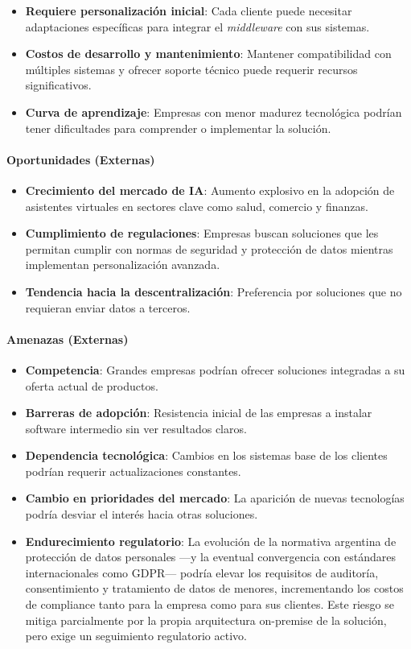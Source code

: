 \begin{itemize}
    \item \textbf{Requiere personalización inicial}: Cada cliente puede necesitar adaptaciones específicas para integrar el \textit{middleware} con sus sistemas.
    \item \textbf{Costos de desarrollo y mantenimiento}: Mantener compatibilidad con múltiples sistemas y ofrecer soporte técnico puede requerir recursos significativos.
    \item \textbf{Curva de aprendizaje}: Empresas con menor madurez tecnológica podrían tener dificultades para comprender o implementar la solución.
\end{itemize}

\paragraph{Oportunidades (Externas)}

\begin{itemize}
    \item \textbf{Crecimiento del mercado de IA}: Aumento explosivo en la adopción de asistentes virtuales en sectores clave como salud, comercio y finanzas.
    \item \textbf{Cumplimiento de regulaciones}: Empresas buscan soluciones que les permitan cumplir con normas de seguridad y protección de datos mientras implementan personalización avanzada.
    \item \textbf{Tendencia hacia la descentralización}: Preferencia por soluciones que no requieran enviar datos a terceros.
\end{itemize}

\paragraph{Amenazas (Externas)}

\begin{itemize}
    \item \textbf{Competencia}: Grandes empresas podrían ofrecer soluciones integradas a su oferta actual de productos.
    \item \textbf{Barreras de adopción}: Resistencia inicial de las empresas a instalar software intermedio sin ver resultados claros.
    \item \textbf{Dependencia tecnológica}: Cambios en los sistemas base de los clientes podrían requerir actualizaciones constantes.
    \item \textbf{Cambio en prioridades del mercado}: La aparición de nuevas tecnologías podría desviar el interés hacia otras soluciones.
    \item \textbf{Endurecimiento regulatorio}: La evolución de la normativa argentina de protección de datos personales —y la eventual convergencia con estándares internacionales como GDPR— podría elevar los requisitos de auditoría, consentimiento y tratamiento de datos de menores, incrementando los costos de compliance tanto para la empresa como para sus clientes. Este riesgo se mitiga parcialmente por la propia arquitectura on-premise de la solución, pero exige un seguimiento regulatorio activo.
\end{itemize}

